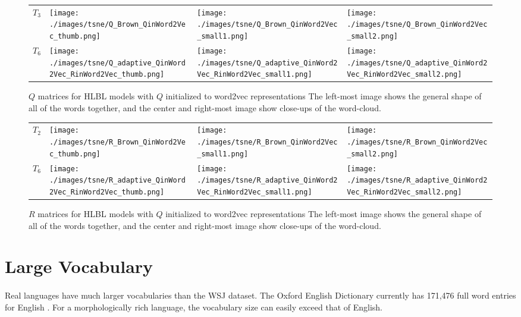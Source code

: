 \begin{figure}[p]
\centering
\begin{tabular}{@{}m{2cm}m{3.5cm}m{3.5cm}m{3.5cm}@{}}
$T_3$&
\texttt{[image: ./images/tsne/Q\_Brown\_QinWord2Vec\_thumb.png]} &
\texttt{[image: ./images/tsne/Q\_Brown\_QinWord2Vec\_small1.png]} &
\texttt{[image: ./images/tsne/Q\_Brown\_QinWord2Vec\_small2.png]}
\\
$T_6$ &
\texttt{[image: ./images/tsne/Q\_adaptive\_QinWord2Vec\_RinWord2Vec\_thumb.png]} &
\texttt{[image: ./images/tsne/Q\_adaptive\_QinWord2Vec\_RinWord2Vec\_small1.png]} &
\texttt{[image: ./images/tsne/Q\_adaptive\_QinWord2Vec\_RinWord2Vec\_small2.png]}
\end{tabular}
\caption{$Q$ matrices for HLBL models with $Q$ initialized to word2vec representations The left-most image shows the general shape of all of the words together, and the center and right-most image show close-ups of the word-cloud.}
\label{fig:QcloudWord2Vec}
\end{figure}

\begin{figure}[p]
\centering
\begin{tabular}{@{}m{2cm}m{3.5cm}m{3.5cm}m{3.5cm}@{}}
$T_2$ &
\texttt{[image: ./images/tsne/R\_Brown\_QinWord2Vec\_thumb.png]} &
\texttt{[image: ./images/tsne/R\_Brown\_QinWord2Vec\_small1.png]} &
\texttt{[image: ./images/tsne/R\_Brown\_QinWord2Vec\_small2.png]}
\\
$T_6$ &
\texttt{[image: ./images/tsne/R\_adaptive\_QinWord2Vec\_RinWord2Vec\_thumb.png]} &
\texttt{[image: ./images/tsne/R\_adaptive\_QinWord2Vec\_RinWord2Vec\_small1.png]} &
\texttt{[image: ./images/tsne/R\_adaptive\_QinWord2Vec\_RinWord2Vec\_small2.png]}
\end{tabular}
\caption{$R$ matrices for HLBL models with $Q$ initialized to word2vec representations The left-most image shows the general shape of all of the words together, and the center and right-most image show close-ups of the word-cloud.}
\label{fig:RcloudWord2Vec}
\end{figure}


\section{Large Vocabulary}
\paragraph{}
Real languages have much larger vocabularies than the WSJ dataset. The Oxford English Dictionary currently has 171,476 full word entries for English \cite{OED}. For a morphologically rich language, the vocabulary size can easily exceed that of English.
